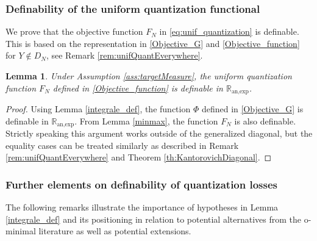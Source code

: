 \documentclass[11pt]{article}
\newcommand{\1}{\mathbbm{1}}
\newtheorem{lem}{Lemma}[section]
\numberwithin{equation}{section}
\begin{document}
\subsubsection{Definability of the uniform quantization functional}
We prove that the objective function $F_N$ in \eqref{eq:unif_quantization} is definable. This is based on the representation in \eqref{Objective_G} and \eqref{Objective_function} for $Y\notin D_N$, see Remark \ref{rem:unifQuantEverywhere}. 
\begin{lem}\label{lem_F_definable}
	Under Assumption \ref{ass:targetMeasure}, the uniform quantization function $F_{N}$ defined in \eqref{Objective_function} is definable in  $\mathbb{R}_{\text{an,exp}}$.
\end{lem}

\begin{proof}
	Using Lemma \ref{integrale_def}, the function $\Phi$ defined in \eqref{Objective_G} is definable in  $\mathbb{R}_{\text{an,exp}}$. From Lemma \ref{minmax}, the function $F_N$ is also definable. Strictly speaking this argument works outside of the generalized diagonal, but the equality cases can be treated similarly as described in Remark \ref{rem:unifQuantEverywhere} and Theorem \ref{th:KantorovichDiagonal}.
\end{proof}

\subsubsection{Further elements on definability of quantization losses}
\label{sec:furtherElementsDefinability}
\label{subsec:rate_Lloyd}

The following remarks illustrate the importance of hypotheses in Lemma \ref{integrale_def} and its positioning in relation to potential alternatives from the o-minimal literature as well as potential extensions.
\end{document}
